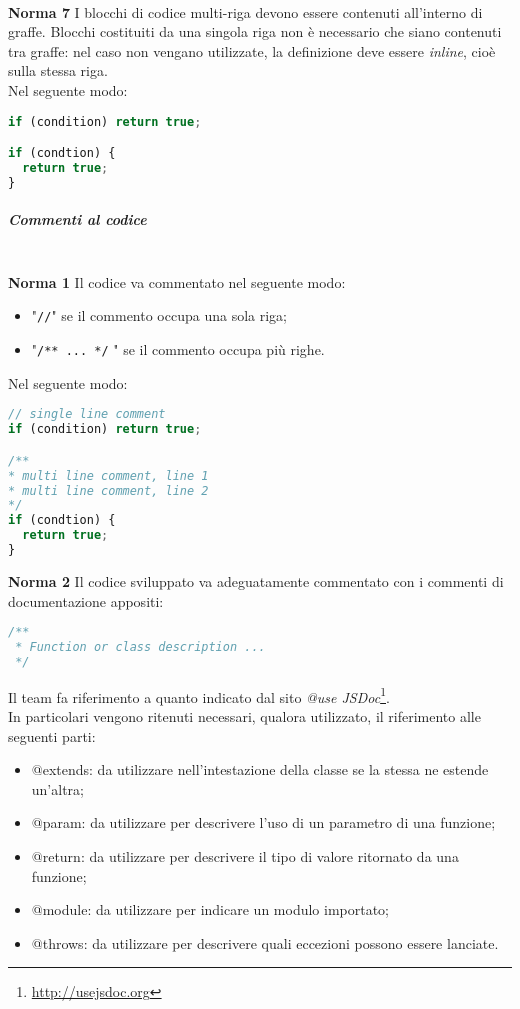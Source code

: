 \-\\
\textbf{Norma 7}
I blocchi di codice multi-riga devono essere contenuti all'interno di graffe. Blocchi costituiti da una singola riga non è necessario che siano contenuti tra graffe: nel caso non vengano utilizzate, la definizione deve essere \textit{inline}, cioè sulla stessa riga.\\
Nel seguente modo:
\begin{lstlisting}[language=JavaScript]
if (condition) return true;

if (condtion) {
  return true;
}
\end{lstlisting}

\subparagraph{Commenti al codice}\-\\
\textbf{Norma 1}
Il codice va commentato nel seguente modo:
\begin{itemize}
	\item "\texttt{//}" se il commento occupa una sola riga;
	\item "\texttt{/** ... */} " se il commento occupa più righe.
\end{itemize}
Nel seguente modo:
\begin{lstlisting}[language=JavaScript]
// single line comment
if (condition) return true;

/**
* multi line comment, line 1
* multi line comment, line 2
*/
if (condtion) {
  return true;
}
\end{lstlisting}
\textbf{Norma 2}\label{Docs_Codice}
Il codice sviluppato va adeguatamente commentato con i commenti di documentazione appositi:
\begin{lstlisting}[language=JavaScript]
/**
 * Function or class description ...
 */
\end{lstlisting}
Il team fa riferimento a quanto indicato dal sito \textit{@use JSDoc}\footnote{\url{http://usejsdoc.org}}.\\
In particolari vengono ritenuti necessari, qualora utilizzato, il riferimento alle seguenti parti:
\begin{itemize}
	\item @extends: da utilizzare nell'intestazione della classe se la stessa ne estende un'altra;
	\item @param: da utilizzare per descrivere l'uso di un parametro di una funzione;
	\item @return: da utilizzare per descrivere il tipo di valore ritornato da una funzione; 
	\item @module: da utilizzare per indicare un modulo importato;
	\item @throws: da utilizzare per descrivere quali eccezioni possono essere lanciate.
\end{itemize}
